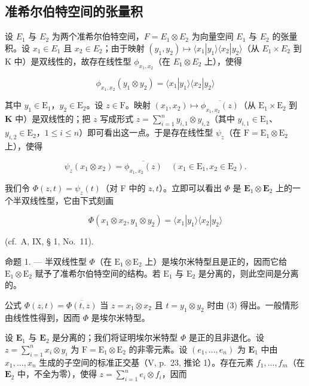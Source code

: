 \subsection{准希尔伯特空间的张量积}

设 \(E_{1}\) 与 \(E_{2}\) 为两个准希尔伯特空间，\(F = E_{1} \otimes E_{2}\) 为向量空间 \(E_{1}\) 与 \(E_{2}\) 的张量积。设 \(x_{1} \in E_{1}\) 且 \(x_{2} \in E_{2}\)；由于映射 \((y_{1}, y_{2}) \mapsto \langle x_{1}|y_{1} \rangle \langle x_{2}|y_{2} \rangle\)（从 \(E_{1} \times E_{2}\) 到 K 中）是双线性的，故存在线性型 \(\phi_{x_{1},x_{2}}\)（在 \(E_{1} \otimes E_{2}\) 上），使得

\[
\phi_ {x _ {1}, x _ {2}} (y _ {1} \otimes y _ {2}) = \langle x _ {1} | y _ {1} \rangle \langle x _ {2} | y _ {2} \rangle\tag{1}
\]

其中 \(y_{1} \in \mathrm{E}_{1}\)，\(y_{2} \in \mathrm{E}_{2}\)。设 \(z \in \mathrm{F}\)。映射 \((x_{1}, x_{2}) \mapsto \overline{\phi_{x_{1},x_{2}}(z)}\)（从 \(\mathrm{E}_1 \times \mathrm{E}_2\) 到 \(\mathbf{K}\) 中）是双线性的；把 \(z\) 写成形式 \(z = \sum_{i=1}^{n} y_{i,1} \otimes y_{i,2}\)（其中 \(y_{i,1} \in \mathrm{E}_1\)、\(y_{i,2} \in \mathrm{E}_2\)，\(1 \leqslant i \leqslant n\)）即可看出这一点。于是存在线性型 \(\psi_z\)（在 \(\mathrm{F} = \mathrm{E}_1 \otimes \mathrm{E}_2\) 上），使得

\[
\psi_ {z} (x _ {1} \otimes x _ {2}) = \overline {{\phi_ {x _ {1} , x _ {2}} (z)}} \quad (x _ {1} \in \mathrm{E} _ {1}, x _ {2} \in \mathrm{E} _ {2}).\tag{2}
\]

我们令 \(\Phi(z, t) = \psi_z(t)\)（对 F 中的 \(z, t\)）。立即可以看出 \(\Phi\) 是 \(\mathbf{E}_1 \otimes \mathbf{E}_2\) 上的一个半双线性型，它由下式刻画

\[
\Phi (x _ {1} \otimes x _ {2}, y _ {1} \otimes y _ {2}) = \langle x _ {1} | y _ {1} \rangle \langle x _ {2} | y _ {2} \rangle\tag{3}
\]

(cf.~A, IX, § 1, No.~11).

命题 1. --- 半双线性型 \(\Phi\)（在 \(\mathrm{E}_1 \otimes \mathrm{E}_2\) 上）是埃尔米特型且是正的，因而它给 \(\mathrm{E}_1 \otimes \mathrm{E}_2\) 赋予了准希尔伯特空间的结构。若 \(\mathrm{E}_1\) 与 \(\mathrm{E}_2\) 是分离的，则此空间是分离的。

公式 \(\Phi(z, t) = \overline{\Phi(t, z)}\) 当 \(z = x_1 \otimes x_2\) 且 \(t = y_1 \otimes y_2\) 时由 (3) 得出。一般情形由线性性得到，因而 \(\Phi\) 是埃尔米特型。

设 \(\mathbf{E}_1\) 与 \(\mathbf{E}_2\) 是分离的；我们将证明埃尔米特型 \(\Phi\) 是正的且非退化。设 \(z = \sum_{i=1}^{n} x_i \otimes y_i\) 为 \(\mathrm{F} = \mathrm{E}_1 \otimes \mathrm{E}_2\) 的非零元素。设 \((e_1, ..., e_n)\) 为 \(\mathbf{E}_1\) 中由 \(x_1, ..., x_n\) 生成的子空间的标准正交基（V, p.~23, 推论 1）。存在元素 \(f_1, ..., f_m\)（在 \(\mathbf{E}_2\) 中，不全为零），使得 \(z = \sum_{i=1}^{n} e_i \otimes f_i\)，因而

